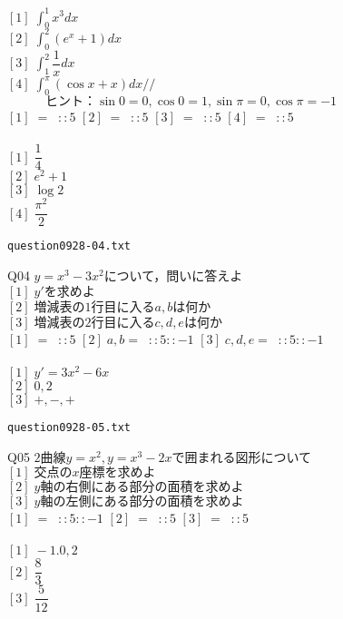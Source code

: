 \documentclass[10pt,dvipdfmx]{jarticle}
\begin{document}
$[1]\;\displaystyle\int_{0}^{1} x^3 dx $\\
$[2]\;\displaystyle\int_{0}^{2} (e^{x}+1) dx $\\
$[3]\;\displaystyle\int_{1}^{2} \dfrac{1}{x} dx $\\
$[4]\;\displaystyle\int_{0}^{{\pi}} (\cos x +x) dx //$\\
$\text{　　　ヒント：}\sin 0 =0,\cos 0 =1,\sin {\pi} =0,\cos {\pi} =-1$\\
$[1]\;=\;\;::5$ 
$[2]\;=\;\;::5$ 
$[3]\;=\;\;::5$ 
$[4]\;=\;\;::5$ 
\\
\\
$[1]\;\dfrac{1}{4}$\\
$[2]\;e^{2}+1$\\
$[3]\;\log 2 $\\
$[4]\;\dfrac{{\pi}^2}{2}$\\
\newpage
\begin{center}
\verb|question0928-04.txt|\\
\end{center}
Q04 
$y=x^3-3x^2\text{について，問いに答えよ}$\\
$[1]\;y'\text{を求めよ}$\\
$[2]\;\text{増減表の}1\text{行目に入る}a,b\text{は何か}$\\
$[3]\;\text{増減表の}2\text{行目に入る}c,d,e\text{は何か}$\\
$[1]\;=\;\;::5$ 
$[2]\;a,b=\;\;::5::-1$ 
$[3]\;c,d,e=\;\;::5::-1$ 
\\
\\
$[1]\;y'=3x^2-6x$\\
$[2]\;0,2$\\
$[3]\;+,-,+$\\
\newpage
\begin{center}
\verb|question0928-05.txt|\\
\end{center}
Q05 
$2\text{曲線}y=x^{2},y=x^{3}-2x\text{で囲まれる図形について}$\\
$[1]\;\text{交点の}x\text{座標を求めよ}$\\
$[2]\;y\text{軸の右側にある部分の面積を求めよ}$\\
$[3]\;y\text{軸の左側にある部分の面積を求めよ}$\\
$[1]\;=\;\;::5::-1$ 
$[2]\;=\;\;::5$ 
$[3]\;=\;\;::5$ 
\\
\\
$[1]\;-1.0,2$\\
$[2]\;\dfrac{8}{3}$\\
$[3]\;\dfrac{5}{12}$\\
\newpage
\end{document}
